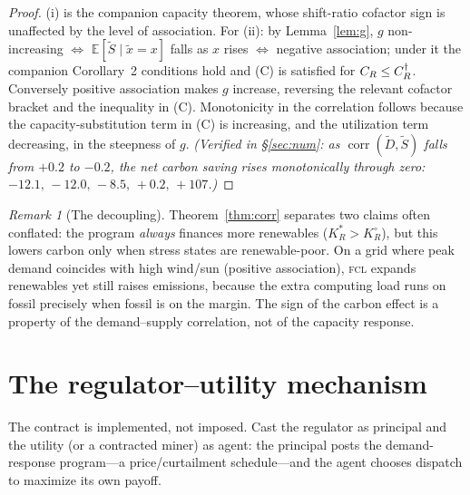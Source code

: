 \documentclass[11pt,reqno]{amsart}
\theoremstyle{plain}
\theoremstyle{definition}
\theoremstyle{remark}
\newtheorem{remark}{Remark}
\newcommand{\KRs}{K_R^{*}}\newcommand{\KFs}{K_F^{*}}\newcommand{\KMs}{K_M^{*}}
\newcommand{\KRo}{K_R^{\circ}}\newcommand{\KFo}{K_F^{\circ}}
\newcommand{\E}{\mathbb{E}}\newcommand{\PP}{\mathbb{P}}
\begin{document}
\begin{proof}
(i) is the companion capacity theorem, whose shift-ratio cofactor sign is
unaffected by the level of association. For (ii): by Lemma~\ref{lem:g},
$g$ non-increasing $\iff$ $\E[\tilde S\mid\tilde x=x]$ falls as $x$ rises $\iff$
negative association; under it the companion Corollary~2 conditions hold and (C)
is satisfied for $C_R\le C_R^{\dagger}$. Conversely positive association makes
$g$ increase, reversing the relevant cofactor bracket and the inequality in (C).
Monotonicity in the correlation follows because the capacity-substitution term in
(C) is increasing, and the utilization term decreasing, in the steepness of $g$.
\emph{(Verified in \S\ref{sec:num}: as $\operatorname{corr}(\tilde D,\tilde S)$
falls from $+0.2$ to $-0.2$, the net carbon saving rises monotonically through
zero: $-12.1,\,-12.0,\,-8.5,\,+0.2,\,+107$.)}
\end{proof}

\begin{remark}[The decoupling]
Theorem~\ref{thm:corr} separates two claims often conflated: the program
\emph{always} finances more renewables ($\KRs>\KRo$), but this lowers carbon only
when stress states are renewable-poor. On a grid where peak demand coincides with
high wind/sun (positive association), \textsc{fcl} expands renewables yet still
raises emissions, because the extra computing load runs on fossil precisely when
fossil is on the margin. The sign of the carbon effect is a property of the
demand--supply correlation, not of the capacity response.
\end{remark}

\section{The regulator--utility mechanism}\label{sec:pa}

The contract is implemented, not imposed. Cast the regulator as principal and the
utility (or a contracted miner) as agent: the principal posts the demand-response
program---a price/curtailment schedule---and the agent chooses dispatch to
maximize its own payoff.
\end{document}
